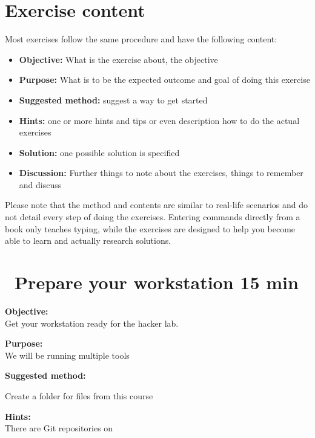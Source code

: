\documentclass[a4paper,11pt,notitlepage]{report}
\begin{document}

\chapter*{\color{titlecolor}Exercise content}

Most exercises follow the same procedure and have the following content:
\begin{itemize}
\item {\bf Objective:} What is the exercise about, the objective
\item {\bf Purpose:} What is to be the expected outcome and goal of doing this exercise
\item {\bf Suggested method:} suggest a way to get started
\item {\bf Hints:} one or more hints and tips or even description how to
do the actual exercises
\item {\bf Solution:} one possible solution is specified
\item {\bf Discussion:} Further things to note about the exercises, things to remember and discuss
\end{itemize}

Please note that the method and contents are similar to real-life scenarios and do not detail every step of doing the exercises. Entering commands directly from a book only teaches typing, while the exercises are designed to help you become able to learn and actually research solutions.


\chapter{\faExclamationTriangle\ Prepare your workstation 15 min}
\label{ex:prepare-for-course}

{\bf Objective:}\\
Get your workstation ready for the hacker lab.


{\bf Purpose:}\\
We will be running multiple tools


{\bf Suggested method:}\\
\begin{list2}
\item Create a folder for files from this course
\end{list2}


{\bf Hints:}\\
There are Git repositories on 
\end{document}
